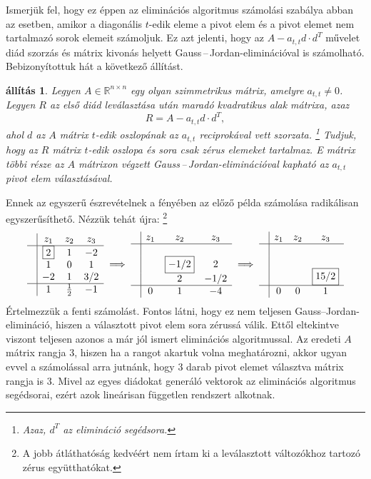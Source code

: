 \documentclass[a4paper, showtrims]{memoir}
\theoremstyle{plain}
\newtheorem{proposition}{állítás}[chapter]
\theoremstyle{remark}
\theoremstyle{definition}
\begin{document}
Ismerjük fel, hogy ez éppen az eliminációs algoritmus számolási szabálya abban az esetben, 
amikor a diagonális $t$-edik eleme a pivot elem és a pivot elemet nem tartalmazó sorok elemeit számoljuk.
Ez azt jelenti, hogy az $A-a_{t,t}d\cdot d^T$ művelet diád szorzás és mátrix kivonás helyett Gauss\,--\,Jordan-eliminációval is számolható.
Bebizonyítottuk hát a következő állítást.
\begin{proposition}
   Legyen $A\in\mathbb{R}^{n\times n}$ egy olyan szimmetrikus mátrix,
   amelyre $a_{t,t}\neq 0$.
   Legyen $R$ az első diád leválasztása után maradó kvadratikus alak mátrixa,
   azaz 
   $$R=A-a_{t,t}d\cdot d^T,$$
   ahol $d$ az $A$ mátrix $t$-edik oszlopának az $a_{t,t}$ reciprokával vett szorzata.%
   \footnote{Azaz, $d^T$ az elimináció segédsora.}
   Tudjuk, hogy az $R$ mátrix $t$-edik oszlopa és sora csak zérus elemeket tartalmaz.
   E mátrix többi része az $A$ mátrixon végzett Gauss\,--\,Jordan-eliminációval 
   kapható az $a_{t,t}$ pivot elem választásával.
\end{proposition}
Ennek az egyszerű észrevételnek a fényében az előző példa számolása radikálisan egyszerűsíthető. 
Nézzük tehát újra:%
\footnote{A jobb átláthatóság kedvéért nem írtam ki a leválasztott változókhoz tartozó zérus együtthatókat.}
\[
\begin{array}{c|ccc}
     & z_1       & z_2 & z_3 \\
     \hline
     & \boxed{2} & 1   & -2  \\
     & 1         & 0   & 1   \\
     & -2        & 1   & 3/2 \\
    \hline
    & 1    & \frac{1}{2}   & -1
\end{array}
\implies
\begin{array}{c|ccc}
     & z_1       & z_2  & z_3 \\
     \hline
     & &                &       \\
     & & \boxed{-1/2}   & 2     \\
     & &            2   & -1/2  \\
     \hline
     &0 & 1         & -4
\end{array}
\implies
\begin{array}{c|ccc}
     & z_1       & z_2 & z_3 \\
     \hline
     & &   &     \\
     & &   &     \\
     & &   & \boxed{15/2}    \\
    \hline
     &0 & 0         & 1
\end{array}
\]
Értelmezzük a fenti számolást. 
Fontos látni, hogy ez nem teljesen Gauss--Jordan-elimináció, 
hiszen a választott pivot elem sora zérussá válik. 
Ettől eltekintve viszont teljesen azonos a már jól ismert eliminációs algoritmussal.
Az eredeti $A$ mátrix rangja $3$, 
hiszen ha a rangot akartuk volna meghatározni, akkor ugyan evvel a számolással arra jutnánk,
hogy $3$ darab pivot elemet választva mátrix rangja is $3$.
Mivel az egyes diádokat generáló vektorok az eliminációs algoritmus segédsorai,
ezért azok lineárisan független rendszert alkotnak.
\end{document}
